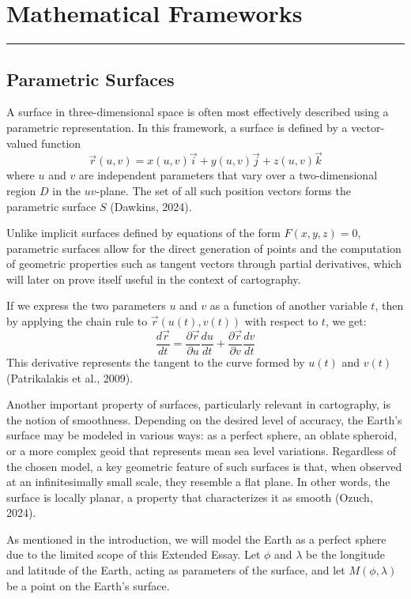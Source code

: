 \section{Mathematical Frameworks}
\hrule height 1pt
\vspace*{5pt}

\subsection{Parametric Surfaces}
\vspace*{-10pt}
A surface in three-dimensional space is often most effectively 
described using a parametric representation. In this framework, a 
surface is defined by a vector-valued function
\[
    \vec{r}(u,v)=x(u,v)\vec{i} + y(u,v)\vec{j} + z(u,v)\vec{k}
\]
where $u$ and $v$ are independent parameters that vary over a 
two-dimensional region $D$ in the $uv$-plane. The set of all such position 
vectors forms the parametric surface $S$ (Dawkins, 2024).

Unlike implicit surfaces defined by equations of the form $F(x,y,z)=0$, parametric
surfaces allow for the direct generation of points and the computation of geometric
properties such as tangent vectors through partial derivatives, which will later 
on prove itself useful in the context of cartography.

If we express the two parameters $u$ and $v$ as a function of another variable
$t$, then by applying the chain rule to $\vec{r}(u(t),v(t))$ with respect to 
$t$, we get:
\[
    \frac{d\vec{r}}{dt}=\frac{\partial \vec{r}}{\partial u}\frac{du}{dt}+\frac{\partial \vec{r}}{\partial v}\frac{dv}{dt}
\]
This derivative represents the tangent to the curve formed by $u(t)$ and $v(t)$ 
(Patrikalakis et al., 2009).

Another important property of surfaces, particularly relevant in cartography, 
is the notion of smoothness. Depending on the desired level of accuracy, the 
Earth's surface may be modeled in various ways: as a perfect sphere, an oblate 
spheroid, or a more complex geoid that represents mean sea level variations. 
Regardless of the chosen model, a key geometric feature of such surfaces is 
that, when observed at an infinitesimally small scale, they resemble a flat 
plane. In other words, the surface is locally planar, a property that 
characterizes it as smooth (Ozuch, 2024).

As mentioned in the introduction, we will model the Earth as a perfect sphere
due to the limited scope of this Extended Essay. Let $\phi$ and $\lambda$ be
the longitude and latitude of the Earth, acting as parameters of the surface, 
and let $M(\phi,\lambda)$ be a point on the Earth's surface. 

